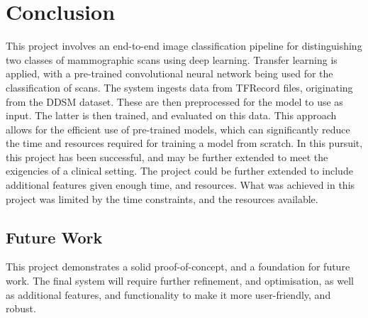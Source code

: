 \documentclass[../main]{subfiles}
\begin{document}
\chapter{Conclusion}
This project involves an end-to-end image classification pipeline for distinguishing two classes of mammographic scans using deep learning. Transfer learning is applied, with a pre-trained convolutional neural network being used for the classification of scans. The system ingests data from TFRecord files, originating from the DDSM dataset. These are then preprocessed for the model to use as input. The latter is then trained, and evaluated on this data. This approach allows for the efficient use of pre-trained models, which can significantly reduce the time and resources required for training a model from scratch. In this pursuit, this project has been successful, and may be further extended to meet the exigencies of a clinical setting. The project could be further extended to include additional features given enough time, and resources. What was achieved in this project was limited by the time constraints, and the resources available.

\section{Future Work}
This project demonstrates a solid proof-of-concept, and a foundation for future work. The final system will require further refinement, and optimisation, as well as additional features, and functionality to make it more user-friendly, and robust.
\end{document}
